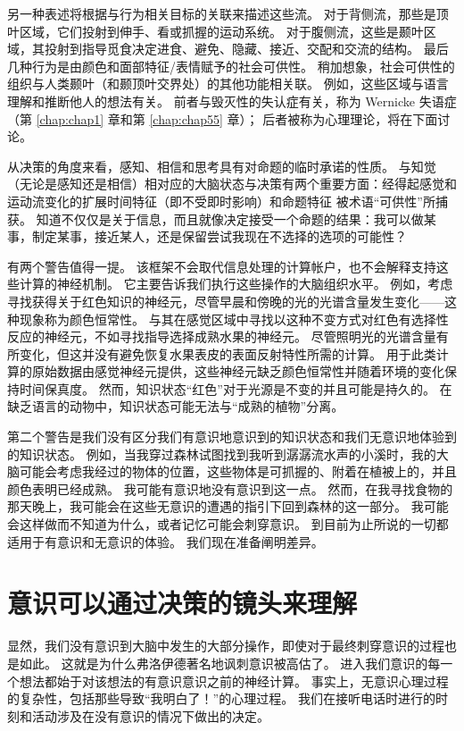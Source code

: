另一种表述将根据与行为相关目标的关联来描述这些流。 对于背侧流，那些是顶叶区域，它们投射到伸手、看或抓握的运动系统。 对于腹侧流，这些是颞叶区域，其投射到指导觅食决定进食、避免、隐藏、接近、交配和交流的结构。 最后几种行为是由颜色和面部特征/表情赋予的社会可供性。 稍加想象，社会可供性的组织与人类颞叶（和颞顶叶交界处）的其他功能相关联。 例如，这些区域与语言理解和推断他人的想法有关。 前者与毁灭性的失认症有关，称为 Wernicke 失语症（第 \ref{chap:chap1} 章和第 \ref{chap:chap55} 章）； 后者被称为心理理论，将在下面讨论。

从决策的角度来看，感知、相信和思考具有对命题的临时承诺的性质。 与知觉（无论是感知还是相信）相对应的大脑状态与决策有两个重要方面：经得起感觉和运动流变化的扩展时间特征（即不受即时影响）和命题特征 被术语“可供性”所捕获。 知道不仅仅是关于信息，而且就像决定接受一个命题的结果：我可以做某事，制定某事，接近某人，还是保留尝试我现在不选择的选项的可能性？

有两个警告值得一提。 该框架不会取代信息处理的计算帐户，也不会解释支持这些计算的神经机制。 它主要告诉我们执行这些操作的大脑组织水平。 例如，考虑寻找获得关于红色知识的神经元，尽管早晨和傍晚的光的光谱含量发生变化——这种现象称为颜色恒常性。 与其在感觉区域中寻找以这种不变方式对红色有选择性反应的神经元，不如寻找指导选择成熟水果的神经元。 尽管照明光的光谱含量有所变化，但这并没有避免恢复水果表皮的表面反射特性所需的计算。 用于此类计算的原始数据由感觉神经元提供，这些神经元缺乏颜色恒常性并随着环境的变化保持时间保真度。 然而，知识状态“红色”对于光源是不变的并且可能是持久的。 在缺乏语言的动物中，知识状态可能无法与“成熟的植物”分离。

第二个警告是我们没有区分我们有意识地意识到的知识状态和我们无意识地体验到的知识状态。 例如，当我穿过森林试图找到我听到潺潺流水声的小溪时，我的大脑可能会考虑我经过的物体的位置，这些物体是可抓握的、附着在植被上的，并且颜色表明已经成熟。 我可能有意识地没有意识到这一点。 然而，在我寻找食物的那天晚上，我可能会在这些无意识的遭遇的指引下回到森林的这一部分。 我可能会这样做而不知道为什么，或者记忆可能会刺穿意识。 到目前为止所说的一切都适用于有意识和无意识的体验。 我们现在准备阐明差异。


\section{意识可以通过决策的镜头来理解}
显然，我们没有意识到大脑中发生的大部分操作，即使对于最终刺穿意识的过程也是如此。 这就是为什么弗洛伊德著名地讽刺意识被高估了。 进入我们意识的每一个想法都始于对该想法的有意识意识之前的神经计算。 事实上，无意识心理过程的复杂性，包括那些导致“我明白了！”的心理过程。 我们在接听电话时进行的时刻和活动涉及在没有意识的情况下做出的决定。

